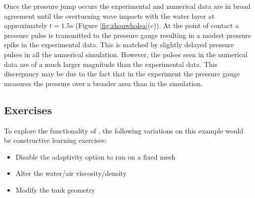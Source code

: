 Once the pressure jump occurs the experimental and numerical data are in broad agreement until the overturning wave impacts with the water layer at approximately $t=1.5s$ (Figure \ref{fig:zhouwholea}(c)).  At the point of contact a pressure pulse is transmitted to the pressure gauge resulting in a modest pressure spike in the experimental data.  This is matched by slightly delayed pressure pulses in all the numerical simulation.  However, the pulses seen in the numerical data are of a much larger magnitude than the experimental data. This discrepancy may be due to the fact that in the experiment the pressure gauge measures the pressure over a broader area than in the simulation. 

\subsection{Exercises}
To explore the functionality of \fluidity, the following variations on this example would be constructive learning exercises:

\begin{itemize}
\item Disable the adaptivity option to run on a fixed mesh
\item Alter the water/air viscosity/density
\item Modify the tank geometry
\end{itemize}

